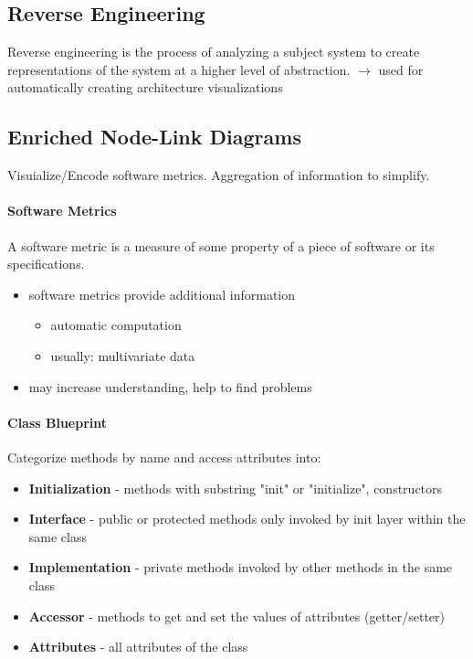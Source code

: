 \documentclass[10pt,a4paper]{article}
\begin{document}
	\subsection{Reverse Engineering}
	Reverse engineering is the process of analyzing a subject system to create representations of the system at a higher level of abstraction. $\rightarrow$ used for automatically creating architecture visualizations
	
	\subsection{Enriched Node-Link Diagrams} 
	Visuialize/Encode software metrics. Aggregation of information to simplify.
	
	\paragraph{Software Metrics} A software metric is a measure of some property of a
	piece of software or its specifications.
	\begin{itemize}
		\item software metrics provide additional information
		\begin{itemize}
			\item automatic computation
			\item usually: multivariate data
		\end{itemize}
		\item may increase understanding, help to find problems
	\end{itemize}
	
	\paragraph{Class Blueprint}
	Categorize methods by name and access attributes into:
	\begin{itemize}
		\item \textbf{Initialization} - methods with substring "init" or "initialize", constructors
		\item \textbf{Interface} - public or protected methods only invoked by init layer within the same class 
		\item \textbf{Implementation} - private methods invoked by other methods in the same class
		\item \textbf{Accessor} - methods to get and set the values of attributes (getter/setter)
		\item \textbf{Attributes} - all attributes of the class
	\end{itemize}
	
\end{document}
